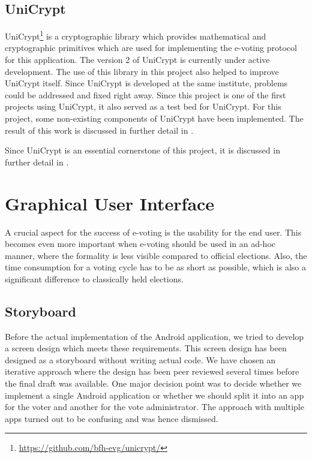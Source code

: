 \documentclass[numbers=noenddot, abstract=on, a4paper, headsepline,
footsepline, oneside, openright, draft=off, listof=leveldown]{scrreprt}
\begin{document}
\subsection{UniCrypt}
\label{sec:unicrypt}
UniCrypt\footnote{\url{https://github.com/bfh-evg/unicrypt/}} is a cryptographic
library which provides mathematical and cryptographic primitives which are used
for implementing the e-voting protocol for this application. The version 2 of
UniCrypt is currently under active development. The use of this library in this
project also helped to improve UniCrypt itself. Since UniCrypt is developed at
the same institute, problems could be addressed and fixed right away. Since
this project is one of the first projects using UniCrypt, it also served as a test
bed for UniCrypt. For this project, some non-existing components of UniCrypt
have been implemented. The result of this work is discussed in further detail in
.

Since UniCrypt is an essential cornerstone of this project, it is discussed in
further detail in .

\section{Graphical User Interface}
\label{sec:gui}
A crucial aspect for the success of e-voting is the usability for the end user.
This becomes even more important when e-voting should be used in an ad-hoc
manner, where the formality is less visible compared to official elections.
Also, the time consumption for a voting cycle has to be as short as possible,
which is also a significant difference to classically held elections.

\subsection{Storyboard}
Before the actual implementation of the Android application, we tried to develop
a screen design which meets these requirements. This screen design has been
designed as a storyboard without writing actual code. We have chosen an
iterative approach where the design has been peer reviewed several times before
the final draft was available. One major decision point was to decide whether we
implement a single Android application or whether we should split it into an app
for the voter and another for the vote administrator. The approach with multiple apps
turned out to be confusing and was hence dismissed.
\end{document}
